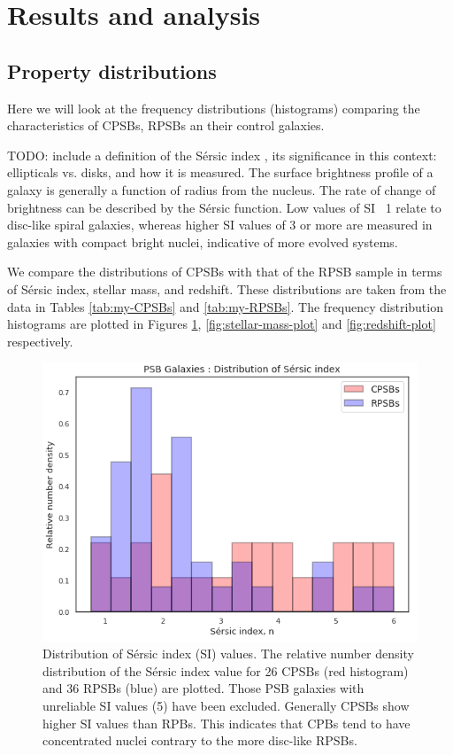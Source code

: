 \section{Results and analysis}
\label{sec:analysis}

\subsection{Property distributions}
Here we will look at the frequency distributions (histograms) comparing the characteristics of CPSBs, RPSBs an their control galaxies.

TODO: include a definition of the S\'ersic index \citep{1963BAAA....6...41S,sérsic1968atlas}, its significance in this context: ellipticals vs. disks, and how it is measured. The surface brightness profile of a galaxy is generally a function of radius from the nucleus. The rate of change of brightness can be described by the S\'ersic function. Low values of SI ~1 relate to disc-like spiral galaxies, whereas higher SI values of 3 or more are measured in galaxies with compact bright nuclei, indicative of more evolved systems.  

We compare the distributions of CPSBs with that of the RPSB sample in terms of S\'ersic index, stellar mass, and redshift. These distributions are taken from the data in Tables \ref{tab:my-CPSBs} and \ref{tab:my-RPSBs}. The frequency distribution histograms are plotted in Figures \ref{fig:Sersic-plot}, \ref{fig:stellar-mass-plot} and \ref{fig:redshift-plot} respectively.

\begin{figure}
    \centering
    \includegraphics[width=\columnwidth]{images/JupyterPlots/Dist-Sersic-Index-All.png}
    \caption{Distribution of S\'ersic index (SI) values. The relative number density distribution of the S\'ersic index value for 26 CPSBs (red histogram) and 36 RPSBs (blue) are plotted. Those PSB galaxies with unreliable SI values (5) have been excluded. Generally CPSBs show higher SI values than RPBs. This indicates that CPBs tend to have concentrated nuclei contrary to the more disc-like RPSBs.}
    \label{fig:Sersic-plot}
\end{figure}

